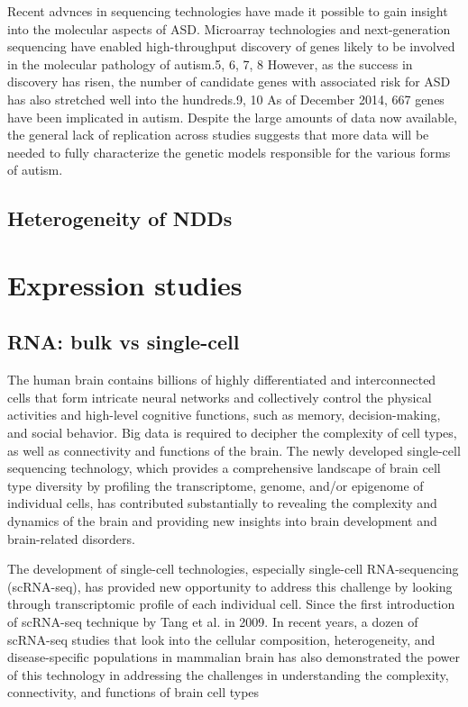 \documentclass[12pt]{article}
\begin{document}
Recent advnces in sequencing technologies have made it possible to gain insight into the molecular aspects of ASD. Microarray technologies and next-generation sequencing have enabled high-throughput discovery of genes likely to be involved in the molecular pathology of autism.5, 6, 7, 8 However, as the success in discovery has risen, the number of candidate genes with associated risk for ASD has also stretched well into the hundreds.9, 10 As of December 2014, 667 genes have been implicated in autism. Despite the large amounts of data now available, the general lack of replication across studies suggests that more data will be needed to fully characterize the genetic models responsible for the various forms of autism.

\subsection{Heterogeneity of NDDs}


\section{Expression studies}

\subsection{RNA: bulk vs single-cell}
The human brain contains billions of highly differentiated and interconnected cells that form intricate neural networks and collectively control the physical activities and high-level cognitive functions, such as memory, decision-making, and social behavior. Big data is required to decipher the complexity of cell types, as well as connectivity and functions of the brain. The newly developed single-cell sequencing technology, which provides a comprehensive landscape of brain cell type diversity by profiling the transcriptome, genome, and/or epigenome of individual cells, has contributed substantially to revealing the complexity and dynamics of the brain and providing new insights into brain development and brain-related disorders.

The development of single-cell technologies, especially single-cell RNA-sequencing (scRNA-seq), has provided new opportunity to address this challenge by looking through transcriptomic profile of each individual cell. Since the first introduction of scRNA-seq technique by Tang et al. in 2009. In recent years, a dozen of scRNA-seq studies that look into the cellular composition, heterogeneity, and disease-specific populations in mammalian brain has also demonstrated the power of this technology in addressing the challenges in understanding the complexity, connectivity, and functions of brain cell types 
\end{document}
